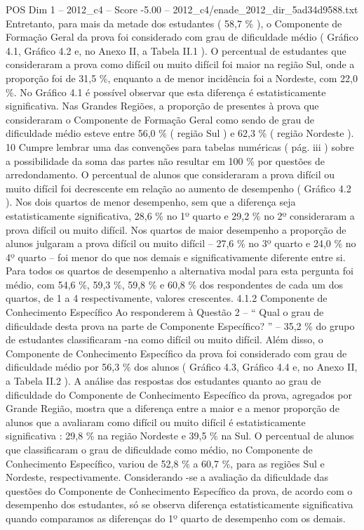 \begin{textsample}{POS Dim 1 – 2012\_c4 – Score -5.00 – 2012\_c4/enade\_2012\_dir\_5ad34d9588.txt}
Entretanto, para mais da metade dos estudantes ( 58,7 \% ), o Componente de Formação Geral da prova foi considerado com grau de dificuldade médio ( Gráfico 4.1, Gráfico 4.2 e, no Anexo II, a Tabela II.1 ).
O percentual de estudantes que consideraram a prova como difícil ou muito difícil foi maior na região Sul, onde a proporção foi de 31,5 \%, enquanto a de menor incidência foi a Nordeste, com 22,0 \%.
No Gráfico 4.1 é possível observar que esta diferença é estatisticamente significativa.
Nas Grandes Regiões, a proporção de presentes à prova que consideraram o Componente de Formação Geral como sendo de grau de dificuldade médio esteve entre 56,0 \% ( região Sul ) e 62,3 \% ( região Nordeste ). 10 Cumpre lembrar uma das convenções para tabelas numéricas ( pág. iii ) sobre a possibilidade da soma das partes não resultar em 100 \% por questões de arredondamento.
O percentual de alunos que consideraram a prova difícil ou muito difícil foi decrescente em relação ao aumento de desempenho ( Gráfico 4.2 ).
Nos dois quartos de menor desempenho, sem que a diferença seja estatisticamente significativa, 28,6 \% no 1º quarto e 29,2 \% no 2º consideraram a prova difícil ou muito difícil.
Nos quartos de maior desempenho a proporção de alunos julgaram a prova difícil ou muito difícil – 27,6 \% no 3º quarto e 24,0 \% no 4º quarto – foi menor do que nos demais e significativamente diferente entre si.
Para todos os quartos de desempenho a alternativa modal para esta pergunta foi médio, com 54,6 \%, 59,3 \%, 59,8 \% e 60,8 \% dos respondentes de cada um dos quartos, de 1 a 4 respectivamente, valores crescentes. 4.1.2 Componente de Conhecimento Específico Ao responderem à Questão 2 – “ Qual o grau de dificuldade desta prova na parte de Componente Específico? ” – 35,2 \% do grupo de estudantes classificaram -na como difícil ou muito difícil.
Além disso, o Componente de Conhecimento Específico da prova foi considerado com grau de dificuldade médio por 56,3 \% dos alunos ( Gráfico 4.3, Gráfico 4.4 e, no Anexo II, a Tabela II.2 ).
A análise das respostas dos estudantes quanto ao grau de dificuldade do Componente de Conhecimento Específico da prova, agregados por Grande Região, mostra que a diferença entre a maior e a menor proporção de alunos que a avaliaram como difícil ou muito difícil é estatisticamente significativa : 29,8 \% na região Nordeste e 39,5 \% na Sul.
O percentual de alunos que classificaram o grau de dificuldade como médio, no Componente de Conhecimento Específico, variou de 52,8 \% a 60,7 \%, para as regiões Sul e Nordeste, respectivamente.
Considerando -se a avaliação da dificuldade das questões do Componente de Conhecimento Específico da prova, de acordo com o desempenho dos estudantes, só se observa diferença estatisticamente significativa quando comparamos as diferenças do 1º quarto de desempenho com os demais.

\end{textsample}
